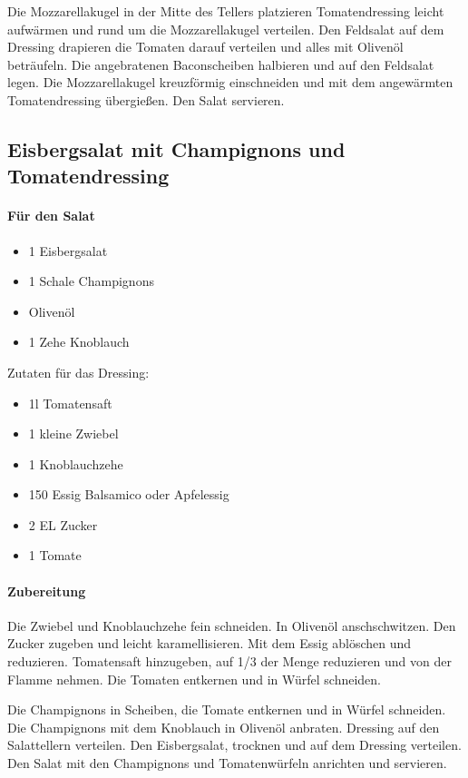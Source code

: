 Die Mozzarellakugel in der Mitte des Tellers platzieren Tomatendressing leicht 
aufwärmen und rund
um die Mozzarellakugel verteilen.  Den Feldsalat auf dem Dressing drapieren 
die Tomaten darauf verteilen 
und alles mit Olivenöl beträufeln. Die angebratenen Baconscheiben halbieren 
und auf den Feldsalat legen. 
Die Mozzarellakugel kreuzförmig einschneiden und mit dem angewärmten 
Tomatendressing übergießen. 
Den Salat servieren.

\subsection{Eisbergsalat mit Champignons und Tomatendressing}

\paragraph{Für den Salat}

\begin{itemize}[noitemsep]
	\item 1 Eisbergsalat
	\item 1 Schale Champignons
	\item Olivenöl
	\item 1 Zehe Knoblauch
\end{itemize}

Zutaten für das Dressing:
\begin{itemize}[noitemsep]
	\item 1l Tomatensaft
	\item 1 kleine Zwiebel
	\item 1 Knoblauchzehe
	\item 150 Essig Balsamico oder Apfelessig
	\item 2 EL Zucker
	\item 1 Tomate
\end{itemize}

\paragraph{Zubereitung}

Die Zwiebel und  Knoblauchzehe fein schneiden. In Olivenöl anschschwitzen.
Den Zucker zugeben und leicht karamellisieren. Mit dem Essig ablöschen und 
reduzieren.
Tomatensaft hinzugeben,  auf 1/3 der Menge reduzieren und von der Flamme 
nehmen. 
Die Tomaten entkernen und in Würfel schneiden.

Die Champignons in Scheiben,  die Tomate entkernen und in Würfel schneiden. 
Die Champignons mit dem Knoblauch in 
Olivenöl anbraten. Dressing auf den Salattellern verteilen. Den Eisbergsalat, 
trocknen und auf dem Dressing verteilen. Den 
Salat mit den Champignons und Tomatenwürfeln anrichten und servieren.
